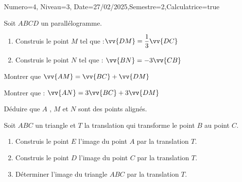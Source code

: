 \documentclass[a4paper,12pt]{article}
\begin{document}
\begin{Maquette}[DS]{Numero=4, Niveau=3, Date=27/02/2025,Semestre=2,Calculatrice=true}
\begin{exercice}
\begin{minipage}{.6\linewidth}
Soit $ABCD$ un parallélogramme.
\begin{enumerate}
\item{} Construis le point $M$ tel que :$\vv{DM}=\dfrac{1}{3}\vv{DC}$
\item{} Construis le point $N$ tel que : $\vv{BN}=-3\vv{CB}$
\end{enumerate}
\end{minipage}%
\begin{minipage}[t]{.4\linewidth}
\end{minipage}
\begin{enumerate}[start=3]
\begin{minipage}{.5\linewidth}
\item Montrer que $\vv{AM}=\vv{BC}+\vv{DM}$\newline
\anserline[5]
\end{minipage}%
\begin{minipage}{.5\linewidth}
\item{} Montrer que : $\vv{AN}=3\vv{BC}+3\vv{DM}$\newline
\anserline[5]
\end{minipage}
\item{} Déduire que $A$ , $M$ et $N$ sont des points alignés.
\newline\anserline[5]
\end{enumerate}
\end{exercice}

\begin{exercice}
Soit $ABC$ un triangle et $T$ la translation qui transforme le point $B$ au point $C$.
\begin{enumerate}
\item{} Construis le point $E$ l'image du point $A$ par la translation $T$.
\item{} Construis le point $D$ l'image du point $C$ par la translation $T$.
\item{} Déterminer l'image du triangle $ABC$ par la translation $T$.
\end{enumerate}
\end{exercice}


\end{Maquette}
\end{document}
